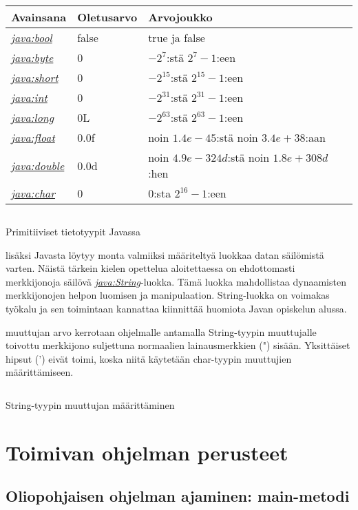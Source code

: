 \documentclass{tufte-book}
\newcommand{\java}[1]{\underline{\gls{java:#1}}}
\newcommand{\newjava}[1]{\textit{\java{#1}}}
\newcommand{\code}[3]{
\begin{listing}
    \inputminted{java}{OhjelmointiopasEsimerkit/src/#1/#2.java}
    \caption{#3}
    \label{Java-#1-#2}
\end{listing}
}
\begin{document}
\bigskip
\begin{center}
\footnotesize
\begin{tabular}{lll}
\toprule
Avainsana & Oletusarvo & Arvojoukko \\
\midrule
\newjava{bool} & false & true ja false \\
\addlinespace
\newjava{byte} & 0 & $-2^7$:stä $2^7-1$:een \\
\addlinespace
\newjava{short} & 0 & $-2^{15}$:stä $2^{15}-1$:een \\
\addlinespace
\newjava{int} & 0 & $-2^{31}$:stä $2^{31}-1$:een \\
\addlinespace
\newjava{long} & 0L & $-2^{63}$:stä $2^{63}-1$:een \\
\addlinespace
\newjava{float} & 0.0f & noin $1.4e-45$:stä noin $3.4e+38$:aan \\
\addlinespace
\newjava{double} & 0.0d & noin $4.9e-324d$:stä noin $1.8e+308d$:hen \\
\addlinespace
\newjava{char} & 0 & $0$:sta $2^{16}-1$:een \\
\bottomrule
\end{tabular}
\end{center}

\code{week2}{BasicDataTypes}{Primitiiviset tietotyypit Javassa}

 lisäksi Javasta löytyy monta valmiiksi määriteltyä luokkaa datan
säilömistä varten. Näistä tärkein kielen opettelua aloitettaessa on ehdottomasti merkkijonoja
säilövä \newjava{String}-luokka. Tämä luokka mahdollistaa dynaamisten merkkijonojen helpon luomisen
ja manipulaation. String-luokka on voimakas työkalu ja sen toimintaan kannattaa kiinnittää huomiota
Javan opiskelun alussa.

 muuttujan arvo kerrotaan ohjelmalle antamalla String-tyypin
muuttujalle toivottu merkkijono suljettuna normaalien lainausmerkkien (") sisään. Yksittäiset 
hipsut (') eivät toimi, koska niitä käytetään char-tyypin muuttujien määrittämiseen.

\code{week2}{BasicString}{String-tyypin muuttujan määrittäminen}

\section{Toimivan ohjelman perusteet}

\subsection{Oliopohjaisen ohjelman ajaminen: main-metodi}
\end{document}
